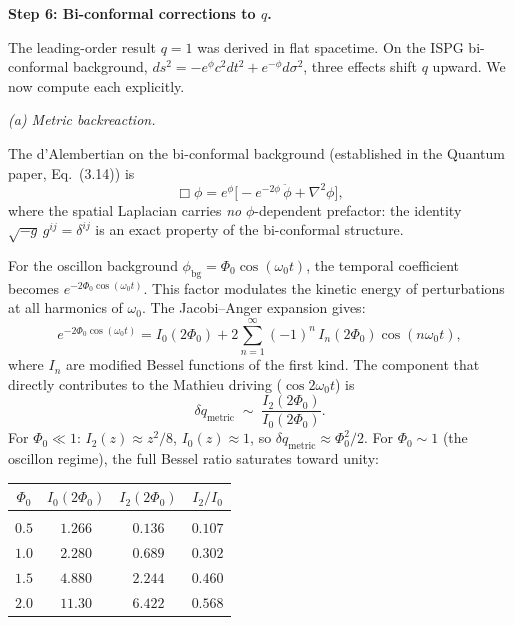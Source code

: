 \documentclass[11pt]{article}
\begin{document}
\medskip
\textbf{Step 6: Bi-conformal corrections to $q$.}

The leading-order result $q = 1$ was derived in flat
spacetime. On the ISPG bi-conformal background,
$ds^2 = -e^{\phi}c^2 dt^2 + e^{-\phi}d\sigma^2$,
three effects shift $q$ upward. We now compute each
explicitly.

\medskip
\textit{(a) Metric backreaction.}

The d'Alembertian on the bi-conformal background
(established in the Quantum paper, Eq.~(3.14)) is
\begin{equation}
  \Box\phi = e^{\phi}\bigl[
    -e^{-2\phi}\,\ddot\phi + \nabla^2\phi
  \bigr],
  \label{eq:box_biconf}
\end{equation}
where the spatial Laplacian carries \emph{no}
$\phi$-dependent prefactor: the identity
$\sqrt{-g}\,g^{ij} = \delta^{ij}$ is an exact
property of the bi-conformal structure.

For the oscillon background
$\phi_{\mathrm{bg}} = \Phi_0\cos(\omega_0 t)$,
the temporal coefficient becomes
$e^{-2\Phi_0\cos(\omega_0 t)}$.
This factor modulates the kinetic energy of
perturbations at all harmonics of $\omega_0$.
The Jacobi--Anger expansion gives:
\begin{equation}
  e^{-2\Phi_0\cos(\omega_0 t)}
  = I_0(2\Phi_0)
  + 2\sum_{n=1}^{\infty}(-1)^n\,
  I_n(2\Phi_0)\cos(n\omega_0 t),
  \label{eq:jacobi_anger}
\end{equation}
where $I_n$ are modified Bessel functions of the
first kind. The component that directly contributes
to the Mathieu driving ($\cos 2\omega_0 t$) is
\begin{equation}
  \delta q_{\mathrm{metric}}
  \;\sim\;
  \frac{I_2(2\Phi_0)}{I_0(2\Phi_0)}.
  \label{eq:dq_metric}
\end{equation}
For $\Phi_0 \ll 1$:
$I_2(z) \approx z^2/8$,
$I_0(z) \approx 1$, so
$\delta q_{\mathrm{metric}} \approx \Phi_0^2/2$.
For $\Phi_0 \sim 1$ (the oscillon regime), the
full Bessel ratio saturates toward unity:

\smallskip
\begin{center}
\renewcommand{\arraystretch}{1.2}
\begin{tabular}{@{}cccc@{}}
$\Phi_0$ & $I_0(2\Phi_0)$ & $I_2(2\Phi_0)$
  & $I_2/I_0$ \\[2pt]\hline\\[-6pt]
$0.5$ & $1.266$ & $0.136$ & $0.107$ \\
$1.0$ & $2.280$ & $0.689$ & $0.302$ \\
$1.5$ & $4.880$ & $2.244$ & $0.460$ \\
$2.0$ & $11.30$ & $6.422$ & $0.568$ \\
\end{tabular}
\end{center}
\end{document}
